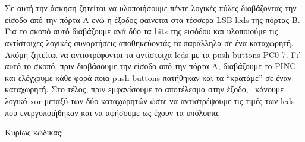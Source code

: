 \section{}
Σε αυτή την άσκηση ζητείται να υλοποιήσουμε πέντε λογικές πύλες διαβάζοντας
την είσοδο από την πόρτα Α ενώ η έξοδος φαίνεται στα τέσσερα LSB leds της
πόρτας Β. Για το σκοπό αυτό διαβάζουμε ανά δύο τα bits της εισόδου και
υλοποιούμε τις αντίστοιχες λογικές συναρτήσεις αποθηκεύοντάς τα παράλληλα σε
ένα καταχωρητή. Ακόμη ζητείται να αντιστρέφονται τα αντίστοιχα leds με τα
push-buttons PC0-7. Γι’ αυτό το σκοπό, πριν διαβάσουμε την είσοδο από την
πόρτα Α, διαβάζουμε το PINC και ελέγχουμε κάθε φορά ποια push-buttons
πατήθηκαν και τα “κρατάμε” σε έναν καταχωρητή. Στο τέλος, πριν εμφανίσουμε το
αποτέλεσμα στην έξοδο,  κάνουμε λογικό xor μεταξύ των δύο καταχωρητών ώστε να
αντιστρέψουμε τις τιμές των leds που ενεργοποιήθηκαν και να αφήσουμε ως έχουν
τα υπόλοιπα.

\noindent Κυρίως κώδικας:
\inputminted[linenos,obeytabs,fontsize=\footnotesize]{c}{files/part1.S}
